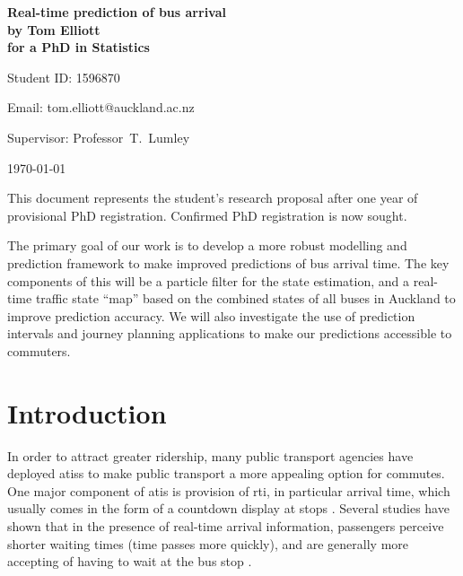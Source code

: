 \documentclass[12pt,a4paper]{article}
\begin{document}
\begin{Large}
\begin{center}
\textbf{Real-time prediction of bus arrival} \\
\textbf{by Tom Elliott} \\
\textbf{for a PhD in Statistics}
\end{center}
\end{Large}


\hfill{Student ID: 1596870}

\hfill{Email: tom.elliott@auckland.ac.nz}

Supervisor: Professor~T.~Lumley




\begin{center}
\today
\end{center}


This document represents the student's research proposal after
one year of provisional PhD registration.
Confirmed PhD registration is now sought.


\vspace{2em}
\noindent
The primary goal of our work is to develop a more robust modelling
and prediction framework to make improved predictions of bus arrival time.
The key components of this will be a particle filter for the state estimation,
and a real-time traffic state ``map'' based on the combined states of all buses in Auckland
to improve prediction accuracy.
We will also investigate the use of prediction intervals and journey planning applications
to make our predictions accessible to commuters.



\section{Introduction}
\label{sec:intro}




In order to attract greater ridership, many public transport agencies have deployed \glspl{atis}
to make public transport a more appealing option for commutes.
One major component of \gls{atis} is provision of \gls{rti},
in particular arrival time,
which usually comes in the form of a countdown display at stops
\citep{tcrp:2003}.
Several studies have shown that in the presence of real-time arrival information,
passengers perceive shorter waiting times (time passes more quickly),
and are generally more accepting of having to wait at the bus stop
\citep{tcrp:2003b}.
\end{document}
